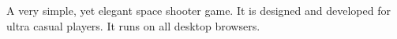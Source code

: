 \documentclass[10pt,a4paper,ragged2e]{altacv}
\begin{document}







    { A very simple, yet elegant space shooter game. It is designed and developed for ultra casual players. It runs on all desktop browsers. } 
















\end{document}

